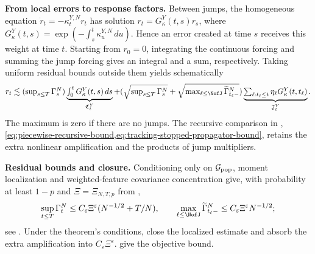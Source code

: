 \noindent
\textbf{From local errors to response factors.}
Between jumps, the homogeneous equation
\(\dot r_t=-\kappa_t^{Y,N}r_t\) has solution
\(r_t=G_\kappa^Y(t,s)r_s\), where
\(G_\kappa^Y(t,s)=\exp(-\int_s^t\kappa_u^{Y,N}\,du)\).
Hence an error created at time \(s\) receives this weight at time \(t\).
Starting from \(r_0=0\), integrating the continuous forcing and summing
the jump forcing gives an integral and a sum, respectively.
Taking uniform residual bounds outside them yields schematically
\[
 \textstyle r_t\lesssim
 (\sup_{s\le T}\Gamma_s^N)
 \underbrace{\textstyle\int_0^tG_\kappa^Y(t,s)\,ds}_{\mathfrak C_t^Y}
 +(\sqrt{\sup_{s\le T}\Gamma_s^N}
       +\sqrt{\max_{\ell\le\NofJ}\widetilde\Gamma_{t_\ell-}^N})
 \underbrace{\textstyle\sum_{\ell:t_\ell\le t}\eta_\ell
                  G_\kappa^Y(t,t_\ell)}_{\mathfrak J_t^Y}.
\]
The maximum is zero if there are no jumps.
The recursive comparison in ,
\cref{eq:piecewise-recursive-bound,eq:tracking-stopped-propagator-bound},
retains the extra nonlinear amplification and the products of jump multipliers.

\noindent
\textbf{Residual bounds and closure.}
Conditioning only on \(\mathcal G_{\rm pop}\), moment localization and
weighted-feature covariance concentration give, with probability at least
\(1-p\) and \(\Xi=\Xi_{N,T,p}\) from ,
\[
 \sup_{t\le T}\Gamma_t^N
 \le C_\varepsilon\Xi^\varepsilon(N^{-1/2}+T/N),\qquad
 \max_{\ell\le\NofJ}\widetilde\Gamma_{t_\ell-}^N
 \le C_\varepsilon\Xi^\varepsilon N^{-1/2};
\]
see .
Under the theorem's conditions,
close the localized estimate and absorb the extra amplification into
\(C_\varepsilon\Xi^\varepsilon\).
give the objective bound.
